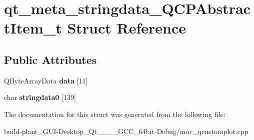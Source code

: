 \hypertarget{structqt__meta__stringdata__QCPAbstractItem__t}{}\section{qt\+\_\+meta\+\_\+stringdata\+\_\+\+Q\+C\+P\+Abstract\+Item\+\_\+t Struct Reference}
\label{structqt__meta__stringdata__QCPAbstractItem__t}
\subsection*{Public Attributes}
\begin{DoxyCompactItemize}
\item 
\mbox{\label{structqt__meta__stringdata__QCPAbstractItem__t_a9e33f2a80b5df62d63aafd9326b07a92}} 
Q\+Byte\+Array\+Data {\bfseries data} \mbox{[}11\mbox{]}
\item 
\mbox{\label{structqt__meta__stringdata__QCPAbstractItem__t_a4a1f8f9acd2583f039a05de696c20ba6}} 
char {\bfseries stringdata0} \mbox{[}139\mbox{]}
\end{DoxyCompactItemize}


The documentation for this struct was generated from the following file\+:\begin{DoxyCompactItemize}
\item 
build-\/plant\+\_\+\+G\+U\+I-\/\+Desktop\+\_\+\+Qt\+\_\+\_\+\_\+\_\+\+G\+C\+C\+\_\+64bit-\/\+Debug/moc\+\_\+qcustomplot.\+cpp\end{DoxyCompactItemize}
